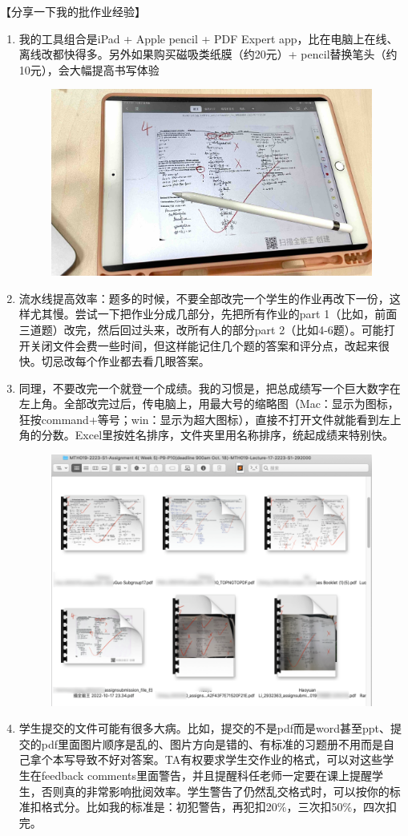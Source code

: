 \emptyline
【分享一下我的批作业经验】
\begin{enumerate}
    \item 我的工具组合是iPad + Apple pencil + PDF Expert app，比在电脑上在线、离线改都快得多。另外如果购买磁吸类纸膜（约20元）+ pencil替换笔头（约10元），会大幅提高书写体验
        \begin{figure}[H]
            \centering
            \includegraphics[width=0.5\columnwidth]{author-folder/Kai.Wu/marking_tools.jpg}
        \end{figure}
    \item 流水线提高效率：题多的时候，不要全部改完一个学生的作业再改下一份，这样尤其慢。尝试一下把作业分成几部分，先把所有作业的part 1（比如，前面三道题）改完，然后回过头来，改所有人的部分part 2（比如4-6题）。可能打开关闭文件会费一些时间，但这样能记住几个题的答案和评分点，改起来很快。切忌改每个作业都去看几眼答案。
    \item 同理，不要改完一个就登一个成绩。我的习惯是，把总成绩写一个巨大数字在左上角。全部改完过后，传电脑上，用最大号的缩略图（Mac：显示为图标，狂按command+等号；win：显示为超大图标），直接不打开文件就能看到左上角的分数。Excel里按姓名排序，文件夹里用名称排序，统起成绩来特别快。
        \begin{figure}[H]
            \centering
            \includegraphics[width=0.7\columnwidth]{author-folder/Kai.Wu/tongchengji.png}
        \end{figure}
    \item 学生提交的文件可能有很多大病。比如，提交的不是pdf而是word甚至ppt、提交的pdf里面图片顺序是乱的、图片方向是错的、有标准的习题册不用而是自己拿个本写导致不好对答案。TA有权要求学生交作业的格式，可以对这些学生在feedback comments里面警告，并且提醒科任老师一定要在课上提醒学生，否则真的非常影响批阅效率。学生警告了仍然乱交格式时，可以按你的标准扣格式分。比如我的标准是：初犯警告，再犯扣20\%，三次扣50\%，四次扣完。

\end{enumerate}
